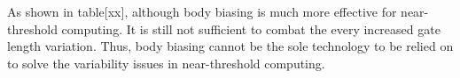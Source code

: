 As shown in table[xx], although body biasing is much more effective for
near-threshold computing. It is still not sufficient to combat the every
increased gate length variation. Thus, body biasing cannot be the sole
technology to be relied on to solve the variability issues in near-threshold
computing. 


